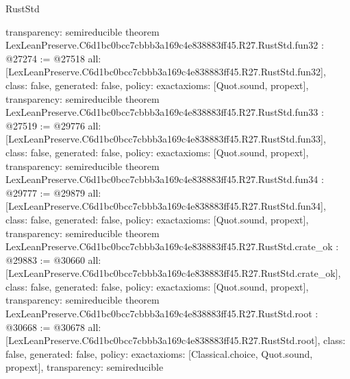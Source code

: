\begin{lexlean}{RustStd}
\begin{coremodule}
{  transparency: semireducible
}
theorem LexLeanPreserve.C6d1bc0bcc7cbbb3a169c4e838883ff45.R27.RustStd.fun32 : @27274 := @27518 {
  all: [LexLeanPreserve.C6d1bc0bcc7cbbb3a169c4e838883ff45.R27.RustStd.fun32],
  class: false,
  generated: false,
  policy: exact{axioms: [Quot.sound, propext]},
  transparency: semireducible
}
theorem LexLeanPreserve.C6d1bc0bcc7cbbb3a169c4e838883ff45.R27.RustStd.fun33 : @27519 := @29776 {
  all: [LexLeanPreserve.C6d1bc0bcc7cbbb3a169c4e838883ff45.R27.RustStd.fun33],
  class: false,
  generated: false,
  policy: exact{axioms: [Quot.sound, propext]},
  transparency: semireducible
}
theorem LexLeanPreserve.C6d1bc0bcc7cbbb3a169c4e838883ff45.R27.RustStd.fun34 : @29777 := @29879 {
  all: [LexLeanPreserve.C6d1bc0bcc7cbbb3a169c4e838883ff45.R27.RustStd.fun34],
  class: false,
  generated: false,
  policy: exact{axioms: [Quot.sound, propext]},
  transparency: semireducible
}
theorem LexLeanPreserve.C6d1bc0bcc7cbbb3a169c4e838883ff45.R27.RustStd.crate_ok : @29883 := @30660 {
  all: [LexLeanPreserve.C6d1bc0bcc7cbbb3a169c4e838883ff45.R27.RustStd.crate_ok],
  class: false,
  generated: false,
  policy: exact{axioms: [Quot.sound, propext]},
  transparency: semireducible
}
theorem LexLeanPreserve.C6d1bc0bcc7cbbb3a169c4e838883ff45.R27.RustStd.root : @30668 := @30678 {
  all: [LexLeanPreserve.C6d1bc0bcc7cbbb3a169c4e838883ff45.R27.RustStd.root],
  class: false,
  generated: false,
  policy: exact{axioms: [Classical.choice, Quot.sound, propext]},
  transparency: semireducible
}


\end{coremodule}
\end{lexlean}
